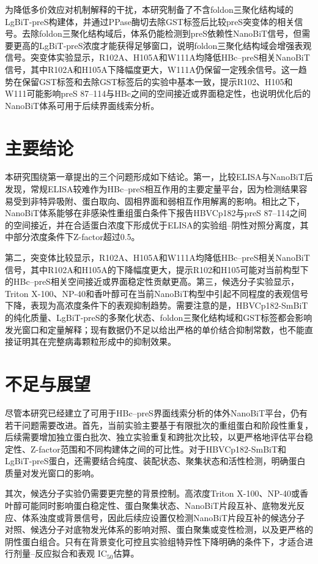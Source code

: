 为降低多价效应对机制解释的干扰，本研究制备了不含foldon三聚化结构域的LgBiT-preS构建体，并通过PPase酶切去除GST标签后比较preS突变体的相关信号。去除foldon三聚化结构域后，体系仍能检测到preS依赖性NanoBiT信号，但需要更高的LgBiT-preS浓度才能获得足够窗口，说明foldon三聚化结构域会增强表观信号。突变体实验显示，R102A、H105A和W111A均降低HBc--preS相关NanoBiT信号，其中R102A和H105A下降幅度更大，W111A仍保留一定残余信号。这一趋势在保留GST标签和去除GST标签后的实验中基本一致，提示R102、H105和W111可能影响preS 87--114与HBc之间的空间接近或界面稳定性，也说明优化后的NanoBiT体系可用于后续界面线索分析。

\section{主要结论}

本研究围绕第一章提出的三个问题形成如下结论。第一，比较ELISA与NanoBiT后发现，常规ELISA较难作为HBc--preS相互作用的主要定量平台，因为检测结果容易受到非特异吸附、蛋白取向、固相界面和弱相互作用解离的影响。相比之下，NanoBiT体系能够在非感染性重组蛋白条件下报告HBVCp182与preS 87--114之间的空间接近，并在合适蛋白浓度下形成优于ELISA的实验组--阴性对照分离度，其中部分浓度条件下Z-factor超过0.5。

第二，突变体比较显示，R102A、H105A和W111A均降低HBc--preS相关NanoBiT信号，其中R102A和H105A的下降幅度更大，提示R102和H105可能对当前构型下的HBc--preS相关空间接近或界面稳定性贡献更高。第三，候选分子实验显示，Triton X-100、NP-40和香叶醇可在当前NanoBiT构型中引起不同程度的表观信号下降，表现为高浓度条件下的表观抑制趋势。需要注意的是，HBVCp182-SmBiT的纯化质量、LgBiT-preS的多聚化状态、foldon三聚化结构域和GST标签都会影响发光窗口和定量解释；现有数据仍不足以给出严格的单价结合抑制常数，也不能直接证明其在完整病毒颗粒形成中的抑制效果。

\section{不足与展望}

尽管本研究已经建立了可用于HBc--preS界面线索分析的体外NanoBiT平台，仍有若干问题需要改进。首先，当前实验主要基于有限批次的重组蛋白和阶段性重复，后续需要增加独立蛋白批次、独立实验重复和跨批次比较，以更严格地评估平台稳定性、Z-factor范围和不同构建体之间的可比性。对于HBVCp182-SmBiT和LgBiT-preS蛋白，还需要结合纯度、装配状态、聚集状态和活性检测，明确蛋白质量对发光窗口的影响。

其次，候选分子实验仍需要更完整的背景控制。高浓度Triton X-100、NP-40或香叶醇可能同时影响蛋白稳定性、蛋白聚集状态、NanoBiT片段互补、底物发光反应、体系浊度或背景信号，因此后续应设置仅检测NanoBiT片段互补的候选分子对照、候选分子对底物发光体系的影响对照、蛋白聚集或变性检测，以及更严格的阴性蛋白组合。只有在背景变化可控且实验组特异性下降明确的条件下，才适合进行剂量--反应拟合和表观 IC$_{50}$估算。

